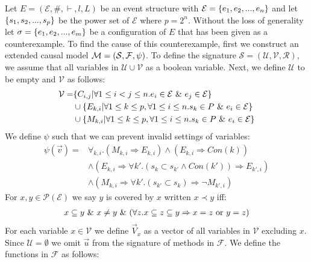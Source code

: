 
Let $E = (\mathcal{E},\#,\vdash,l,L)$ be an event structure with
$\mathcal{E} = \{e_1, e_2, ...,e_n\}$ and let $\{s_1,s_2,...,s_p\}$ be the power set of $\mathcal{E}$ where $p = 2^n$.
Without the loss of generality let $\sigma = \{e_1,e_2,...,e_m\}$ be a configuration of $E$ that
has been given as a counterexample.
To find the cause of this counterexample, first we construct an extended causal model $\mathcal{M} = (\mathcal{S},\mathcal{F},\psi)$.
To define the signature $\mathcal{S} = (\mathcal{U},\mathcal{V},\mathcal{R})$, we assume that all variables in $\mathcal{U} \cup \mathcal{V}$ as a boolean variable.
Next, we define $\mathcal{U}$ to be empty and $\mathcal{V}$ as follows:
\begin{align*}
    \mathcal{V} = & \{C_{i,j} | \forall 1 \leq i < j \leq n. e_i \in \mathcal{E} \ \& \  e_j \in \mathcal{E}\}                    \\
                  & \cup \{E_{k,i} | \forall 1 \leq k \leq p , \forall 1 \leq i \leq n . s_k \in P \ \& \  e_i \in \mathcal{E} \} \\
                  & \cup \{M_{k,i} | \forall 1 \leq k \leq p , \forall 1 \leq i \leq n . s_k \in P \ \& \  e_i \in \mathcal{E} \} \\
\end{align*}
We define $\psi$ such that we can prevent invalid settings of variables:
\begin{align*}
    \psi(\vec v) = & \forall_{k,i}.
    \left(
    M_{k,i} \Rightarrow E_{k,i}
    \right)
    \wedge
    \left(
    E_{k,i} \Rightarrow Con(k)
    \right)
    \\
                   & \wedge \left(E_{k,i} \Rightarrow
    \forall k'. (s_k \subset s_{k'} \wedge Con(k')) \Rightarrow E_{k',i}
    \right)                                           \\
                   & \wedge \left(
    M_{k,i} \Rightarrow \forall k'.
    (s_{k'} \subset s_k) \Rightarrow \neg M_{k',i}
    \right)
\end{align*}
For $x,y \in \mathcal{P}(\mathcal{E})$ we say $y$ is covered by $x$ written $ x \prec y$ iff:
\begin{align*}
    x \subseteq y \ \& \  x \neq y \ \& \ 
    (\forall z. x \subseteq z \subseteq y \Rightarrow x = z
    \text{ or } y = z)
\end{align*}
For each variable $x \in \mathcal{V}$ we define $\vec V_x$ as a vector
of all variables in $\mathcal{V}$ excluding $x$.
Since $\mathcal{U} = \emptyset$ we omit $\vec u$ from the
signature of methods in $\mathcal{F}$.
We define the functions in $\mathcal{F}$ as follows:
